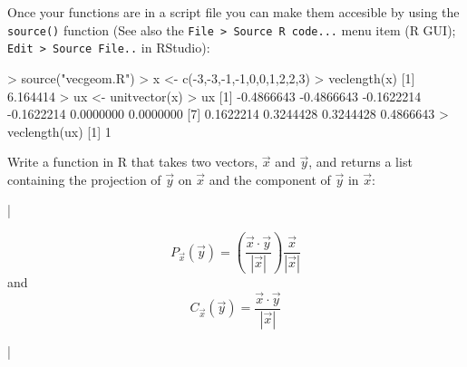 Once your functions are in a script file you can make them accesible by
using the \lstinline!source()! function (See also the
\lstinline!File > Source R code...! menu item (R GUI);
\lstinline!Edit > Source File..! in RStudio):

\begin{R}
> source("vecgeom.R")
> x <- c(-3,-3,-1,-1,0,0,1,2,2,3)
> veclength(x)
[1] 6.164414
> ux <- unitvector(x)
> ux
 [1] -0.4866643 -0.4866643 -0.1622214 -0.1622214  0.0000000  0.0000000
 [7]  0.1622214  0.3244428  0.3244428  0.4866643
> veclength(ux)
 [1] 1
\end{R}

\begin{assignment}
Write a function in R that takes two vectors, $\vec{x}$ and $\vec{y}$, and returns a list containing the projection of $\vec{y}$ on $\vec{x}$ and the component of $\vec{y}$ in $\vec{x}$:

\lstDeleteShortInline|

\[P_{\vec{x}}(\vec{y}) = \left(\frac{\vec{x} \cdot \vec{y}}{|\vec{x}|}\right) \frac{\vec{x}}{|\vec{x}|}\]
and 
\[C_{\vec{x}}(\vec{y}) = \frac{\vec{x} \cdot \vec{y}}{|\vec{x}|}\]

\lstMakeShortInline|

\end{assignment}
